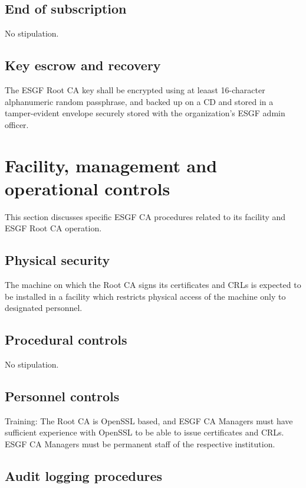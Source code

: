 \subsection{End of subscription}\label{end-of-subscription}

No stipulation.

\subsection{Key escrow and recovery}

The ESGF Root CA key shall be encrypted using at leaast 16-character alphanumeric random passphrase, and backed up on a CD and stored in a tamper-evident envelope securely stored with the organization's ESGF admin officer.

\section{Facility, management and operational controls}\label{facility-management-and-operational-controls}

This section discusses specific ESGF CA procedures related to its
facility and ESGF Root CA operation.

\subsection{Physical security}\label{physical-security-controls}

The machine on which the Root CA signs its certificates and CRLs is
expected to be installed in a facility which restricts physical access of the machine only to designated personnel.

\subsection{Procedural controls}
No stipulation.

\subsection{Personnel controls}\label{personnel-controls}

Training: The Root CA is OpenSSL based, and ESGF CA Managers must
have sufficient experience with OpenSSL to be able to issue certificates
and CRLs. ESGF CA Managers must be permanent staff of the respective institution.

\subsection{Audit logging procedures}\label{audit-logging-procedures}

